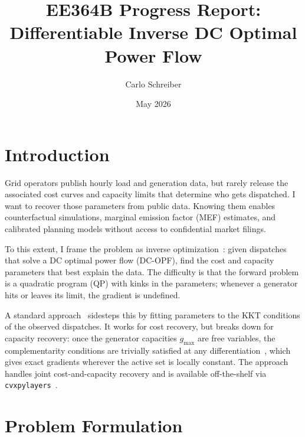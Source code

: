 \documentclass[10pt,letterpaper]{article}
\begin{document}
\title{EE364B Progress Report:\\
Differentiable Inverse DC Optimal Power Flow}

\author{Carlo Schreiber}

\date{May 2026}

\maketitle

\section{Introduction}\label{sec:intro}

Grid operators publish hourly load and generation data, but rarely
release the associated cost curves and capacity limits that determine who gets
dispatched. I want to recover those parameters from public data. Knowing them enables counterfactual simulations, marginal
emission factor (MEF) estimates, and calibrated planning models
without access to confidential market filings.

To this extent, I frame the problem as inverse optimization~\cite{ahuja2001inverse,
esfahani2018data}: given dispatches that solve a DC optimal power
flow (DC-OPF), find the cost and capacity parameters that best
explain the data. The difficulty is that the forward problem is a
quadratic program (QP) with kinks in the parameters; whenever a
generator hits or leaves its limit, the gradient is undefined.

A standard approach~\cite{keshavarz2011imputing} sidesteps this by
fitting parameters to the KKT conditions of the observed dispatches.
It works for cost recovery, but breaks down for capacity recovery:
once the generator capacities $g_{\max}$ are free variables,
the complementarity conditions are trivially satisfied at any
differentiation~\cite{amos2017optnet}, which gives exact gradients
wherever the active set is locally constant. The approach handles
joint cost-and-capacity recovery and is available off-the-shelf
via \texttt{cvxpylayers}~\cite{agrawal2019differentiable}.

\section{Problem Formulation}\label{sec:problem}
\end{document}
